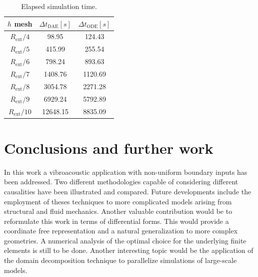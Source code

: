 \documentclass{ifacconf}
\begin{document}
\begin{table}[t]
	\centering
	\begin{tabular}{ccc}
		\hline 
		$h$ mesh & $\Delta t_{\text{DAE}} [s]$ & $\Delta t_{\text{ODE}} [s]$  \\ 
		\hline 
		$R_{\text{ext}}/4$ & 98.95 & 124.43 \\
        $R_{\text{ext}}/5$ & 415.99 & 255.54 \\
        $R_{\text{ext}}/6$ & 798.24 & 893.63 \\
        $R_{\text{ext}}/7$ & 1408.76 & 1120.69 \\
        $R_{\text{ext}}/8$ & 3054.78 & 2271.28 \\
        $R_{\text{ext}}/9$ & 6929.24 & 5792.89 \\
        $R_{\text{ext}}/10$ & 12648.15 & 8835.09 \\
		\hline 
	\end{tabular} 
	\vspace{1mm}
	\caption{Elapsed simulation time.}
	\label{tab:deltaT}
\end{table}

\section{Conclusions and further work}
In this work a vibroacoustic application with non-uniform boundary inputs has been addressed. Two different methodologies capable of considering different causalities have been illustrated and compared. Future developments include the employment of theses techniques to more complicated models arising from structural and fluid mechanics. Another valuable contribution would be to reformulate this work in terms of differential forms. This would provide a coordinate free representation and a natural generalization to more complex geometries. A numerical analysis of the optimal choice for the underlying finite elements is still to be done. Another interesting topic would be the application of the domain decomposition technique to parallelize simulations of large-scale models.
 

\end{document}
